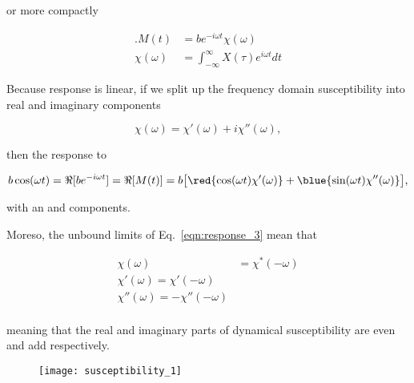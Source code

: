  \noindent or more compactly
 \begin{framed}\noindent

   \begin{equation}\label{eqn:response_3}
     \begin{aligned}.M(t) &= be^{-i\omega t}\chi(\omega)\\ \chi(\omega) &= \int_{-\infty}^{\infty}X(\tau)e^{i\omega t}dt
     \end{aligned}
   \end{equation}

 \end{framed}

 \noindent  Because response  is  linear, if  we split  up  the frequency  domain
 susceptibility into real and imaginary components

  \begin{equation}
    \chi(\omega) = \chi'(\omega) + i\chi''(\omega),
  \end{equation}

  \noindent then the response to

  \begin{equation}\label{eqn:response_4}
    b\cos(\omega t) = \Re[be^{-i\omega t}]  =\Re[M(t)] = b\big[\red{\cos(\omega t)\chi'(\omega)} + \blue{\sin(\omega t)\chi''(\omega)}\big],
  \end{equation}

  \noindent with an  and  components.

  Moreso, the unbound limits of Eq.~\eqref{eqn:response_3} mean that

  \begin{equation}
    \begin{aligned}
      \chi(\omega) & = \chi^{*}(-\omega)\\
      \chi'(\omega) = \chi'(-\omega)\\
      \chi''(\omega) = -\chi''(-\omega)\\
    \end{aligned}
  \end{equation}

  \noindent meaning that the real and imaginary parts of dynamical susceptibility
  are even and add respectively.

\begin{figure}[h]
  \centering \texttt{[image: susceptibility\_1]}
\end{figure}


